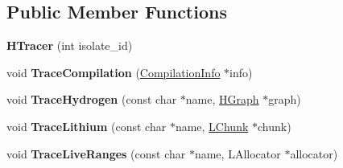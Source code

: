 \subsection*{Public Member Functions}
\begin{DoxyCompactItemize}
\item 
{\bfseries H\+Tracer} (int isolate\+\_\+id)\hypertarget{classv8_1_1internal_1_1_h_tracer_a6461783e84565455063646c57ec8294f}{}\label{classv8_1_1internal_1_1_h_tracer_a6461783e84565455063646c57ec8294f}

\item 
void {\bfseries Trace\+Compilation} (\hyperlink{classv8_1_1internal_1_1_compilation_info}{Compilation\+Info} $\ast$info)\hypertarget{classv8_1_1internal_1_1_h_tracer_ae4e7d6d89293f68036a7aa340fa3fe07}{}\label{classv8_1_1internal_1_1_h_tracer_ae4e7d6d89293f68036a7aa340fa3fe07}

\item 
void {\bfseries Trace\+Hydrogen} (const char $\ast$name, \hyperlink{classv8_1_1internal_1_1_h_graph}{H\+Graph} $\ast$graph)\hypertarget{classv8_1_1internal_1_1_h_tracer_ad406f30471736913fbcfeb31db100d7e}{}\label{classv8_1_1internal_1_1_h_tracer_ad406f30471736913fbcfeb31db100d7e}

\item 
void {\bfseries Trace\+Lithium} (const char $\ast$name, \hyperlink{classv8_1_1internal_1_1_l_chunk}{L\+Chunk} $\ast$chunk)\hypertarget{classv8_1_1internal_1_1_h_tracer_abb7a80f283ffbfc8b1cbc3c0a4c62df0}{}\label{classv8_1_1internal_1_1_h_tracer_abb7a80f283ffbfc8b1cbc3c0a4c62df0}

\item 
void {\bfseries Trace\+Live\+Ranges} (const char $\ast$name, L\+Allocator $\ast$allocator)\hypertarget{classv8_1_1internal_1_1_h_tracer_a8fe6379015e3590bf0fcd3bf25d01d7d}{}\label{classv8_1_1internal_1_1_h_tracer_a8fe6379015e3590bf0fcd3bf25d01d7d}

\end{DoxyCompactItemize}
